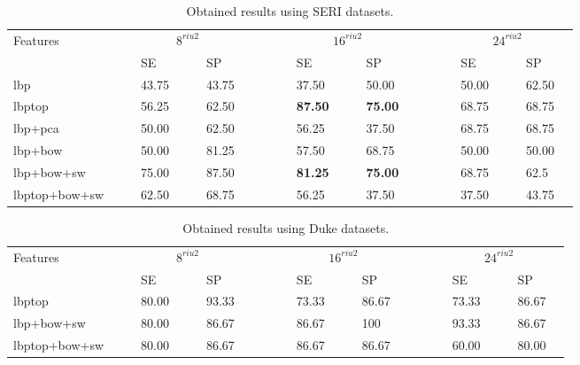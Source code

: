 \begin{tiny}
  \begin{table*}[b]
\caption{Obtained results using SERI datasets.}%
\centering
\begin{tabular}{lcclcclcccclcclcccclcclc}
\toprule
Features 	& & &\multicolumn{4}{c}{$8^{riu2}$}&	 & & & &\multicolumn{4}{c}{$16^{riu2}$}& & & & &\multicolumn{4}{c}{$24^{riu2}$} &\\
  \cmidrule(l){2-8}  \cmidrule(l){10-16}  \cmidrule(l){18-24}
	       & & & SE & & & SP & & & & & SE & & & SP & & & & & SE & & & SP & \\
\midrule
  	\ac{lbp}					& & & 43.75 & & & 43.75 & & & & & 37.50 & & & 50.00 & & & & & 50.00 & & & 62.50 & \\
 	\ac{lbptop}				& & & 56.25 & & & 62.50 & & & & & \textbf{87.50} & & & \textbf{75.00} & & & & & 68.75 & & & 68.75 & \\
	\ac{lbp}+\ac{pca}		& & & 50.00 & & & 62.50 & & & & & 56.25 & & & 37.50 & & & & & 68.75 & & & 68.75 & \\
	\ac{lbp}+\ac{bow}		& & & 50.00 & & & 81.25 & & & & & 57.50 & & & 68.75 & & & & & 50.00 & & & 50.00 & \\
	\ac{lbp}+\ac{bow}+\acs{sw}		& & & 75.00 & & & 87.50 & & & & & \textbf{81.25} & & & \textbf{75.00} & & & & & 68.75 & & & 62.5 & \\
	\ac{lbptop}+\ac{bow}+\acs{sw}		& & & 62.50 & & & 68.75 & & & & & 56.25 & & & 37.50 & & & & & 37.50 & & & 43.75 & \\
\bottomrule
\end{tabular}
\label{tab:SERI-data}
\end{table*}
\end{tiny}

\begin{tiny}
  \begin{table*}[t]
\caption{Obtained results using Duke datasets.}%
\centering
\begin{tabular}{lcclcclcccclcclcccclcclc}
\toprule
Features 	& & &\multicolumn{4}{c}{$8^{riu2}$}&	 & & & &\multicolumn{4}{c}{$16^{riu2}$}& & & & &\multicolumn{4}{c}{$24^{riu2}$} &\\
  \cmidrule(l){2-8}  \cmidrule(l){10-16}  \cmidrule(l){18-24}
	       & & & SE & & & SP & & & & & SE & & & SP & & & & & SE & & & SP & \\
\midrule
 	\ac{lbptop}				& & & 80.00& & & 93.33 & & & & & 73.33 & & & 86.67 & & & & & 73.33 & & & 86.67 & \\
	\ac{lbp}+\ac{bow}+\acs{sw}		& & & 80.00 & & & 86.67 & & & & & 86.67 & & & 100 & & & & &93.33 & & & 86.67 & \\
	\ac{lbptop}+\ac{bow}+\acs{sw}		& & & 80.00 & & & 86.67 & & & & & 86.67 & & & 86.67 & & & & & 60.00 & & & 80.00 & \\
\bottomrule
\end{tabular}
\label{tab:Duke-data}
\end{table*}
\end{tiny}

